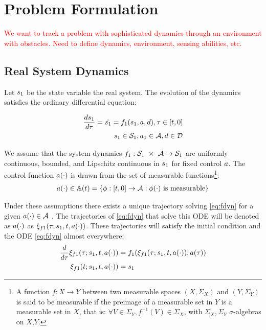 \section{Problem Formulation \label{sec:formulation}}

\textcolor{red}{We want to track a problem with sophisticated dynamics through an environment with obstacles.  Need to define dynamics, environment, sensing abilities, etc.}

\subsection{Real System Dynamics}
Let $s_1$ be the state variable the real system. The evolution of the dynamics satisfies the ordinary differential equation:

\begin{equation}
\begin{aligned}
\label{eq:fdyn}
\frac{ds_1}{d\tau} = \dot{s_1} = f_1(s_1, a, d), \tau \in [t, 0] \\
s_1 \in \mathcal{S}_1, a_1 \in \mathcal{A}, d \in \mathcal{D}
\end{aligned}
\end{equation}

We assume that the system dynamics $f_1 : \mathcal{S}_1\ \times\ \mathcal{A} \rightarrow \mathcal{S}_1$ are uniformly continuous, bounded, and Lipschitz continuous in $s_1$ for fixed control $a$. The control function $a(\cdot)$ is drawn from the set of measurable functions\footnote{A function $f:X\to Y$ between two measurable spaces $(X,\Sigma_X)$ and $(Y,\Sigma_Y)$ is said to be measurable if the preimage of a measurable set in $Y$ is a measurable set in $X$, that is: $\forall V\in\Sigma_Y, f^{-1}(V)\in\Sigma_X$, with $\Sigma_X,\Sigma_Y$ $\sigma$-algebras on $X$,$Y$.}:
\begin{equation}
\begin{aligned}
a(\cdot) \in \mathbb{A}(t) = \{\phi: [t, 0] \rightarrow \mathcal{A}: \phi(\cdot) \text{ is measurable}\}
\end{aligned}
\end{equation}

Under these assumptions there exists a unique trajectory solving \ref{eq:fdyn} for a given $a(\cdot) \in \mathcal{A}$ \cite{Coddington84}. The trajectories of \ref{eq:fdyn} that solve this ODE will be denoted as $a(\cdot)$ as $\xi_{f1}(\tau; s_1, t, a(\cdot))$. These trajectories will satisfy the initial condition and the ODE \ref{eq:fdyn} almost everywhere:
\begin{equation}
\label{eq:fdyn_traj}
\begin{aligned}
\frac{d}{d\tau}\xi_{f1}(\tau; s_1, t, a(\cdot)) &= f_1(\xi_{f1}(\tau; s_1, t, a(\cdot)), a(\tau)) \\
\xi_{f1}(t; s_1, t, a(\cdot)) &= s_1
\end{aligned}
\end{equation}

